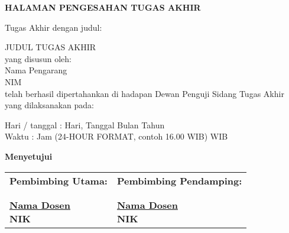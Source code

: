 \vspace*{0cm}

\begin{center}		
	{\large \bfseries HALAMAN PENGESAHAN TUGAS AKHIR \\}
\end{center}
		
\vspace{2cm}

\noindent Tugas Akhir dengan judul:

\noindent JUDUL TUGAS AKHIR\\

\noindent yang disusun oleh: \\
\noindent Nama Pengarang \\
\noindent NIM \\

\noindent telah berhasil dipertahankan di hadapan Dewan Penguji Sidang Tugas Akhir yang dilaksanakan pada: 

\begin{tabs}{3cm}
	\noindent Hari / tanggal \tab : Hari, Tanggal Bulan Tahun \\
	\noindent Waktu \tab : Jam (24-HOUR FORMAT, contoh 16.00 WIB) WIB
\end{tabs}

\vspace{3.2cm}
\begin{center}	
\textbf{Menyetujui} \\
\end{center}

\begin{longtable}{p{6.5cm} p{6.5cm}}
	\centering \textbf{Pembimbing Utama:} &
	\centering \textbf{Pembimbing Pendamping:} \\
	
	\cr \\ \\
		
	\centering \textbf{ \underline{Nama Dosen} \\ NIK} &
	\centering \textbf{ \underline{Nama Dosen} \\ NIK} \\
	
\end{longtable}